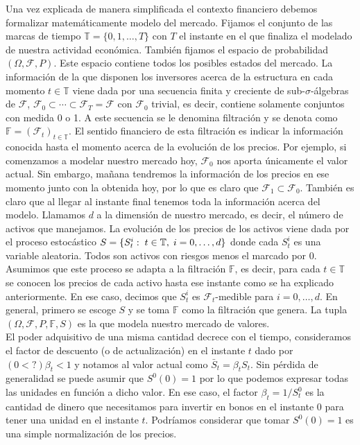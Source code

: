 Una vez explicada de manera simplificada el contexto financiero debemos formalizar matemáticamente modelo del mercado. Fijamos el conjunto de las marcas de tiempo $ \mathbb{T} = \{0,1,\dots,T\}$ con $ T $ el instante en el que finaliza el modelado de nuestra actividad económica. También fijamos el espacio de probabilidad $ (\Omega, \mathcal{F}, P) $. Este espacio contiene todos los posibles estados del mercado. La información de la que disponen los inversores acerca de la estructura en cada momento $ t \in \mathbb{T}$ viene dada por una secuencia finita y creciente de sub-$ \sigma $-álgebras de $ \mathcal{F} $, $ \mathcal{F}_0 \subset \cdots \subset \mathcal{F}_T = \mathcal{F} $ con $ \mathcal{F}_0 $ trivial, es decir, contiene solamente conjuntos con medida 0 o 1. A este secuencia se le denomina filtración y se denota como $ \mathbb{F} = (\mathcal{F}_t)_{t \in \mathbb{T}} $. El sentido financiero de esta filtración es indicar la información conocida hasta el momento acerca de la evolución de los precios. Por ejemplo, si comenzamos a modelar nuestro mercado hoy, $ \mathcal{F}_0 $ nos aporta únicamente el valor actual. Sin embargo, mañana tendremos la información de los precios en ese momento junto con la obtenida hoy, por lo que es claro que $ \mathcal{F}_1 \subset \mathcal{F}_0  $. También es claro que al llegar al instante final tenemos toda la información acerca del modelo. Llamamos $ d  $ a la dimensión de nuestro mercado, es decir, el número de activos que manejamos. La evolución de los precios de los activos viene dada  por el proceso estocástico $ S = \{S^i_t:\hspace{1mm} t \in \mathbb{T},\hspace{1mm} i=0,\dots,d\} $ donde cada $ S^i_t $ es una variable aleatoria. Todos son activos con riesgos menos el marcado por $ 0 $. Asumimos que este proceso se adapta a la filtración $ \mathbb{F} $, es decir, para cada $ t \in \mathbb{T} $ se conocen los precios de cada activo hasta ese instante como se ha explicado anteriormente. En ese caso, decimos que $ S_t^i $ es $ \mathcal{F}_t $-medible para $ i=0,\dots,d $. En general, primero se escoge $ S $ y se toma $ \mathbb{F} $ como la filtración que genera. La tupla $ (\Omega, \mathcal{F}, P, \mathbb{F}, S) $ es la que modela nuestro mercado de valores. \\

El poder adquisitivo de una misma cantidad decrece con el tiempo, consideramos el factor de descuento (o de actualización) en el instante $ t $ dado por $ (0 <?) \beta_t < 1 $ y notamos al valor actual como $ \bar{S}_t = \beta_t S_t $. Sin pérdida de generalidad se puede asumir que $ S^0(0) = 1 $ por lo que podemos expresar todas las unidades en función a dicho valor. En ese caso, el factor $ \beta_t = 1/S^0_t $ es la cantidad de dinero que necesitamos para invertir en bonos en el instante 0 para tener una unidad en el instante $ t $. Podríamos considerar que tomar $ S^0(0) = 1 $  es una simple normalización de los precios. \\

